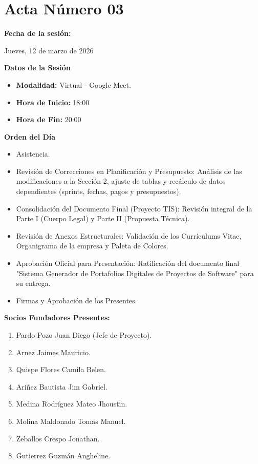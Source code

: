 \newpage
\section{Acta Número 03}
\label{sec:acta03}

\noindent \textbf{Fecha de la sesión:}\par
Jueves, 12 de marzo de 2026

\vspace*{0.5cm}
\noindent \textbf{Datos de la Sesión}
\vspace{-0.2cm}
\begin{itemize}[noitemsep]
    \item \textbf{Modalidad:} Virtual - Google Meet.
    \item \textbf{Hora de Inicio:} 18:00
    \item \textbf{Hora de Fin:} 20:00
\end{itemize}

\noindent \textbf{Orden del Día}
\begin{itemize}[noitemsep]
    \item Asistencia.
    \item Revisión de Correcciones en Planificación y Presupuesto: Análisis de las modificaciones a la Sección 2, ajuste de tablas y recálculo de datos dependientes (sprints, fechas, pagos y presupuestos).
    \item Consolidación del Documento Final (Proyecto TIS): Revisión integral de la Parte I (Cuerpo Legal) y Parte II (Propuesta Técnica).
    \item Revisión de Anexos Estructurales: Validación de los Currículums Vitae, Organigrama de la empresa y Paleta de Colores.
    \item Aprobación Oficial para Presentación: Ratificación del documento final "Sistema Generador de Portafolios Digitales de Proyectos de Software" para su entrega.
    \item Firmas y Aprobación de los Presentes.
\end{itemize}

\noindent \textbf{Socios Fundadores Presentes:}
\begin{enumerate}[noitemsep]
    \item Pardo Pozo Juan Diego (Jefe de Proyecto).
    \item Arnez Jaimes Mauricio.
    \item Quispe Flores Camila Belen.
    \item Ariñez Bautista Jim Gabriel.
    \item Medina Rodríguez Mateo Jhoustin.
    \item Molina Maldonado Tomas Manuel.
    \item Zeballos Crespo Jonathan.
    \item Gutierrez Guzmán Angheline.
\end{enumerate}

